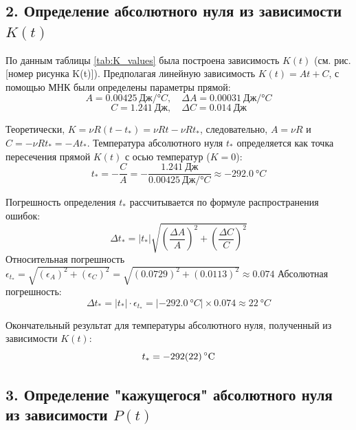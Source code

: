 \documentclass[12pt]{article}
\begin{document}
\subsection*{2. Определение абсолютного нуля из зависимости $K(t)$}

По данным таблицы \ref{tab:K_values} была построена зависимость $K(t)$ (см. рис. [номер рисунка K(t)]).
Предполагая линейную зависимость $K(t) = At + C$, с помощью МНК были определены параметры прямой:
\[ A = \SI{0.00425}{Дж/\degree C}, \quad \Delta A = \SI{0.00031}{Дж/\degree C} \]
\[ C = \SI{1.241}{Дж}, \quad \Delta C = \SI{0.014}{Дж} \]

Теоретически, $K = \nu R (t - t_{*}) = \nu R t - \nu R t_{*}$, следовательно, $A = \nu R$ и $C = - \nu R t_{*} = -A t_{*}$.
Температура абсолютного нуля $t_{*}$ определяется как точка пересечения прямой $K(t)$ с осью температур ($K=0$):
\[ t_{*} = -\frac{C}{A} = -\frac{\SI{1.241}{Дж}}{\SI{0.00425}{Дж/\degree C}} \approx \SI{-292.0}{\degree C} \]

Погрешность определения $t_{*}$ рассчитывается по формуле распространения ошибок:
\[ \Delta t_{*} = |t_{*}| \sqrt{\left(\frac{\Delta A}{A}\right)^2 + \left(\frac{\Delta C}{C}\right)^2} \]
Относительная погрешность $\epsilon_{t_{*}} = \sqrt{(\epsilon_A)^2 + (\epsilon_C)^2} = \sqrt{(\num{0.0729})^2 + (\num{0.0113})^2} \approx \num{0.074}$
Абсолютная погрешность:
\[ \Delta t_{*} = |t_{*}| \cdot \epsilon_{t_{*}} = |\SI{-292.0}{\degree C}| \times \num{0.074} \approx \SI{22}{\degree C} \] %

Окончательный результат для температуры абсолютного нуля, полученный из зависимости $K(t)$:
\[ t_{*} = \SI{-292 \pm 22}{\degree C} \]

\subsection*{3. Определение "кажущегося" абсолютного нуля из зависимости $P(t)$}
\end{document}
